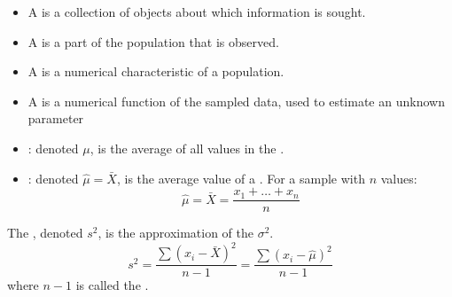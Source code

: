 \begin{multicols}{2}

      \begin{itemize}
        \item A  is a collection of objects about which information is sought.
        \item A  is a part of the population that is observed.
        \item A  is a numerical characteristic of a population.
        \item A  is a numerical function of the sampled data, used to estimate an unknown parameter
      \end{itemize}

      \begin{itemize}
      \item {}: denoted $\mu$, is the average of all values in the .
      \item {}: denoted $\hat{\mu} = \bar{X}$, is the average value of a . For a sample with $n$ values:
        \[
          \hat{\mu} = \bar{X} = \frac{x_1 + \ldots + x_n}{n}
        \]
      \end{itemize}


      \par The , denoted $s^2$, is the approximation of the  $\sigma^2$.
      \[
        s^2 = \frac{\sum (x_i - \bar{X})^2}{n - 1} = \frac{\sum (x_i - \hat{\mu})^2}{n - 1}
      \]
      where $n - 1$ is called the .


\end{multicols}
